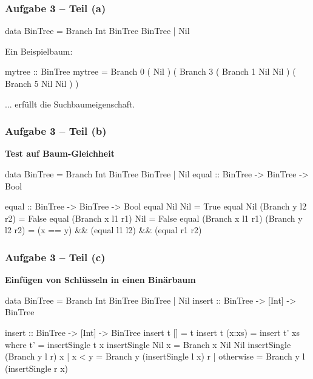 \documentclass{beamer}
\begin{document}
\begin{frame}[t, fragile] \frametitle{Aufgabe 3 -- Teil (a)}
	\begin{codebox}
data BinTree = Branch Int BinTree BinTree | Nil
	\end{codebox}
	\pause
	
	Ein Beispielbaum: \\[6pt]
	\begin{codebox}
mytree :: BinTree 
mytree = Branch 0 
         ( Nil )
         ( Branch 3 
            ( Branch 1 Nil Nil )
            ( Branch 5 Nil Nil )
         )
	\end{codebox}
	... erfüllt die Suchbaumeigenschaft.
\end{frame}


\begin{frame}[t, fragile] \frametitle{Aufgabe 3 -- Teil (b)}
	\textbf{Test auf Baum-Gleichheit}
	
	\pause
	
	\begin{codebox}
data BinTree = Branch Int BinTree BinTree | Nil
equal :: BinTree -> BinTree -> Bool
	\end{codebox}
	
	\bigskip \pause
	
	\begin{codebox}
equal :: BinTree -> BinTree -> Bool
equal Nil              Nil              = True
equal Nil              (Branch y l2 r2) = False
equal (Branch x l1 r1) Nil              = False
equal (Branch x l1 r1) (Branch y l2 r2)
	= (x == y) && (equal l1 l2) && (equal r1 r2)
	\end{codebox}
\end{frame}

\begin{frame}[t, fragile] \frametitle{Aufgabe 3 -- Teil (c)}
	\textbf{Einfügen von Schlüsseln in einen Binärbaum}
	
	\begin{codebox}
data BinTree = Branch Int BinTree BinTree | Nil 
insert :: BinTree -> [Int] -> BinTree
	\end{codebox}
	
	\bigskip \pause
	
	\begin{codebox}
insert :: BinTree -> [Int] -> BinTree
insert t     [] = t
insert t (x:xs) = insert t' xs
  where 
    t' = insertSingle t x
    insertSingle Nil            x = Branch x Nil Nil
    insertSingle (Branch y l r) x
  	    | x < y     = Branch y (insertSingle l x) r
  	    | otherwise = Branch y l (insertSingle r x)
	\end{codebox}
\end{frame}
\end{document}
